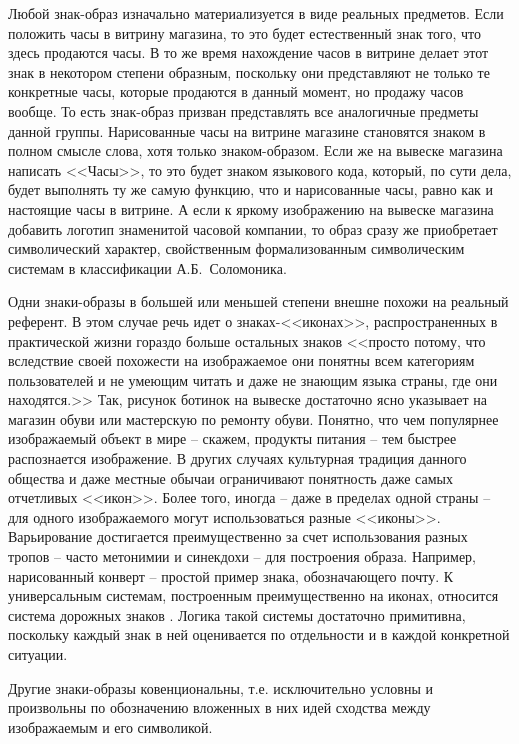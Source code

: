 Любой знак-образ изначально материализуется в виде реальных предметов.
Если положить часы в витрину магазина, то это будет естественный знак того,
что здесь продаются часы. В то же время нахождение часов в витрине делает
этот знак в некотором степени образным, поскольку они представляют не только
те конкретные часы, которые продаются в данный момент, но продажу часов вообще.
То есть знак-образ призван представлять все аналогичные предметы данной группы.
Нарисованные часы на витрине магазине становятся знаком в полном смысле слова,
хотя только знаком-образом. Если же на вывеске магазина написать <<Часы>>,
то это будет знаком языкового кода, который, по сути дела, будет выполнять
ту же самую функцию, что и нарисованные часы, равно как и настоящие часы в
витрине. А если к яркому изображению на вывеске магазина добавить логотип
знаменитой часовой компании, то образ сразу же приобретает символический
характер, свойственным формализованным символическим системам в классификации
А.Б.~Соломоника.

Одни знаки-образы в большей или меньшей степени внешне похожи на реальный референт.
В этом случае речь идет о знаках-<<иконах>>, распространенных в практической жизни
гораздо больше остальных знаков <<просто потому, что вследствие своей похожести на
изображаемое они понятны всем категориям пользователей и не умеющим читать и даже
не знающим языка страны, где они находятся.>> \autocite[][55]{solomonik1995}
Так, рисунок ботинок на вывеске достаточно ясно указывает на магазин обуви или мастерскую по
ремонту обуви. Понятно, что чем популярнее изображаемый объект в мире -- скажем,
продукты питания -- тем быстрее распознается изображение. В других случаях культурная
традиция данного общества и даже местные обычаи ограничивают понятность даже
самых отчетливых <<икон>>. Более того, иногда -- даже в пределах одной страны -- для
одного изображаемого могут использоваться разные <<иконы>>. Варьирование достигается
преимущественно за счет использования разных тропов -- часто метонимии и синекдохи --
для построения образа. Например, нарисованный конверт -- простой пример знака, обозначающего почту.
К универсальным системам, построенным преимущественно на иконах, относится система
дорожных знаков \autocite[][56-58]{solomonik1995}. Логика такой системы достаточно
примитивна, поскольку каждый знак в ней оценивается по отдельности и в каждой
конкретной ситуации.

Другие знаки-образы ковенциональны, т.е. исключительно условны и произвольны
по обозначению вложенных в них идей сходства между изображаемым и его символикой.

